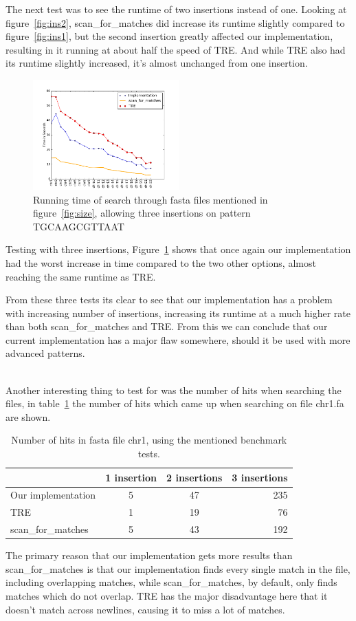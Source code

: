 The next test was to see the runtime of two insertions instead of one. Looking at figure~\ref{fig:ins2}, scan\_for\_matches did increase its runtime slightly compared to figure~\ref{fig:ins1}, but the second insertion greatly affected our implementation, resulting in it running at about half the speed of TRE.  And while TRE also had its runtime slightly increased, it's almost unchanged from one insertion.

\begin{figure}[h!]
\centering
\includegraphics[width=0.5\textwidth]{Benchmarking/3ins.png}
\caption{Running time of search through fasta files mentioned in figure~\ref{fig:size},  allowing three insertions on pattern TGCAAGCGTTAAT}
\label{fig:ins3}
\end{figure}
Testing with three insertions, Figure~\ref{fig:ins3} shows that once again our implementation had the worst increase in time compared to the two other options, almost reaching the same runtime as TRE.


From these three tests its clear to see that our implementation has a problem with increasing number of insertions, increasing its runtime at a much higher rate than both scan\_for\_matches and TRE. From this we can conclude that our current implementation has a major flaw somewhere, should it be used with more advanced patterns. 
\\
~

Another interesting thing to test for was the number of hits when searching the files, in table~\ref{tab:hits} the number of hits which came up when searching on file chr1.fa are shown.

\begin{table}[h!]
\centering
\begin{tabular}{ l | c c r }
& 1 insertion & 2 insertions & 3 insertions\\
\hline
Our implementation& 5 &  47 & 235 \\
TRE& 1 & 19 & 76 \\
scan\_for\_matches & 5 & 43  & 192 \\
\end{tabular}
\caption{Number of hits in fasta file chr1, using the mentioned benchmark tests.}
\label{tab:hits}
\end{table}

The primary reason that our implementation gets more results than scan\_for\_matches is that our implementation finds every single match in the file, including overlapping matches, while scan\_for\_matches, by default, only finds matches which do not overlap. TRE has the major disadvantage here that it doesn't match across newlines, causing it to miss a lot of matches.

